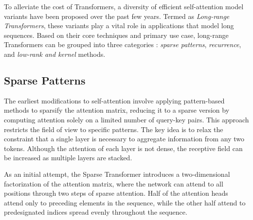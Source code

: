 To alleviate the cost of Transformers, a diversity of efficient self-attention model variants \citep{tay2020efficient} have been proposed over the past few years. Termed as \textit{Long-range Transformers}, these variants play a vital role in applications that model long sequences. Based on their core techniques and primary use case, long-range Transformers can be grouped into three categories \citep{qin2022nlp}: \textit{sparse patterns}, \textit{recurrence}, and \textit{low-rank and kernel} methods. 



\subsection{Sparse Patterns}
\label{subsubsection:related-long-range-modeling-sparse}

The earliest modifications to self-attention involve applying pattern-based methods to sparsify the attention matrix, reducing it to a sparse version by computing attention solely on a limited number of query-key pairs. This approach restricts the field of view to specific patterns.
The key idea is to relax the constraint that a single layer is necessary to aggregate information from any two tokens. Although the attention of each layer is not dense, the receptive field can be increased as multiple layers are stacked. 

As an initial attempt, the Sparse Transformer \citep{child2019generating} introduces a two-dimensional factorization of the attention matrix, where the network can attend to all positions through two steps of sparse attention. Half of the attention heads attend only to preceding elements in the sequence, while the other half attend to predesignated indices spread evenly throughout the sequence. 

